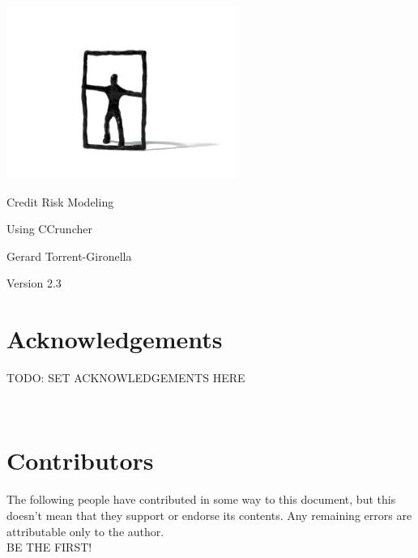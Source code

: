 \documentclass[11pt,fleqn]{book} %
\def\numversion{2.3}
\begin{document}
\begingroup
\thispagestyle{empty}
\vspace*{-1cm}
\centerline{\includegraphics[angle=0]{./Pictures/logo.png}}
\centering
\vspace*{0.5cm}
\par\normalfont\fontsize{35}{35}\sffamily\selectfont
Credit Risk Modeling \par
\par\normalfont\fontsize{25}{25}\sffamily\selectfont
Using CCruncher\par
\vspace*{2cm}
{\huge Gerard Torrent-Gironella}\par
\vspace*{2cm}
\par\normalfont\fontsize{14}{14}\sffamily\selectfont
Version \numversion\par
\endgroup


\newpage

\section*{Acknowledgements}
TODO\@: SET ACKNOWLEDGEMENTS HERE

~\vfill
\section*{Contributors}
The following people have contributed in some way to this document, but this 
doesn't mean that they support or endorse its contents. 
Any remaining errors are attributable only to the author.\\
BE THE FIRST!
\end{document}
